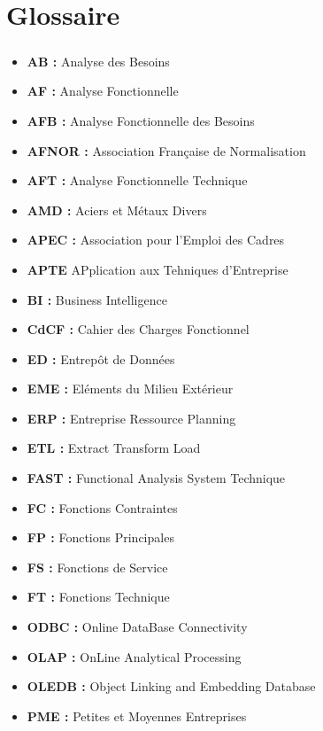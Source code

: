 \chapter*{Glossaire}%
%
\paragraph{}
\begin{itemize}
    \item \textbf{AB :} Analyse des Besoins
    \item \textbf{AF :} Analyse Fonctionnelle
    \item \textbf{AFB :} Analyse Fonctionnelle des Besoins
    \item \textbf{AFNOR :} Association Française de Normalisation
    \item \textbf{AFT :} Analyse Fonctionnelle Technique
    \item \textbf{AMD :} Aciers et Métaux Divers
    \item \textbf{APEC :} Association pour l’Emploi des Cadres
    \item \textbf{APTE} APplication aux Tehniques d'Entreprise
    \item \textbf{BI :} Business Intelligence
    \item \textbf{CdCF :} Cahier des Charges Fonctionnel
    \item \textbf{ED :} Entrepôt de Données
    \item \textbf{EME :} Eléments du Milieu Extérieur
    \item \textbf{ERP :} Entreprise Ressource Planning
    \item \textbf{ETL :} Extract Transform Load
    \item \textbf{FAST :} Functional Analysis System Technique
    \item \textbf{FC :} Fonctions Contraintes
    \item \textbf{FP :} Fonctions Principales
    \item \textbf{FS :} Fonctions  de  Service
    \item \textbf{FT :} Fonctions Technique
    \item \textbf{ODBC :} Online DataBase Connectivity
    \item \textbf{OLAP :} OnLine Analytical Processing
    \item \textbf{OLEDB :} Object Linking and Embedding Database
    \item \textbf{PME :} Petites et Moyennes Entreprises

\end{itemize}
